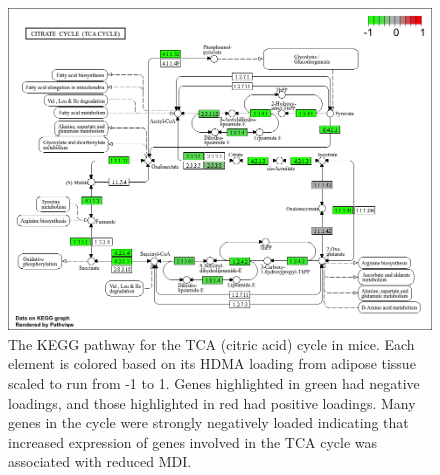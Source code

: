 \documentclass[
]{article}
\begin{document}
\begin{figure}[ht!]
\includegraphics[width=\textwidth]{Figures/Supp_Fig_TCA.png} 
\caption{The KEGG pathway for the TCA (citric acid) cycle in 
mice. Each element is colored based on its HDMA loading from adipose
tissue scaled to run from -1 to 1. Genes highlighted in green had 
negative loadings, and those highlighted in red had positive loadings. 
Many genes in the cycle were strongly negatively loaded indicating 
that increased expression of genes involved in the TCA cycle was 
associated with reduced MDI.
}
\label{fig:TCA_cycle}
\end{figure}
\end{document}

